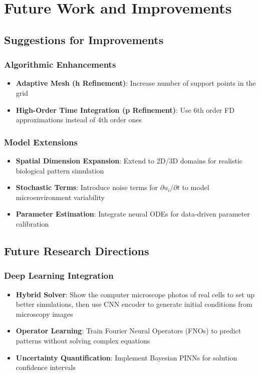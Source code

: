 \documentclass[conference]{IEEEtran}
\begin{document}
\section{Future Work and Improvements}

\subsection{Suggestions for Improvements}
\subsubsection{Algorithmic Enhancements}
\begin{itemize}
    \item \textbf{Adaptive Mesh (h Refinement)}: Increase number of support points in the grid
    \item \textbf{High-Order Time Integration (p Refinement)}: Use 6th order FD approximations instead of 4th order ones
\end{itemize}

\subsubsection{Model Extensions}
\begin{itemize}
    \item \textbf{Spatial Dimension Expansion}: Extend to 2D/3D domains for realistic biological pattern simulation
    \item \textbf{Stochastic Terms}: Introduce noise terms for $\partial u_i/\partial t$ to model microenvironment variability
    \item \textbf{Parameter Estimation}: Integrate neural ODEs for data-driven parameter calibration
\end{itemize}

\subsection{Future Research Directions}

\subsubsection{Deep Learning Integration}
\begin{itemize}
    \item \textbf{Hybrid Solver}: Show the computer microscope photos of real cells to set up better simulations, then use CNN encoder to generate initial conditions from microscopy images
    \item \textbf{Operator Learning}: Train Fourier Neural Operators (FNOs) to predict patterns without solving complex equations
    \item \textbf{Uncertainty Quantification}: Implement Bayesian PINNs for solution confidence intervals
\end{itemize}
\end{document}

